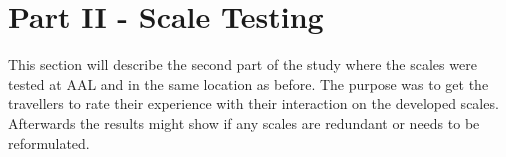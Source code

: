 \section{Part II - Scale Testing}
\label{MethodScaleTesting}
This section will describe the second part of the study where the scales were tested at AAL and in the same location as before. The purpose was to get the travellers to rate their experience with their interaction on the developed scales. Afterwards the results might show if any scales are redundant or needs to be reformulated.
%




